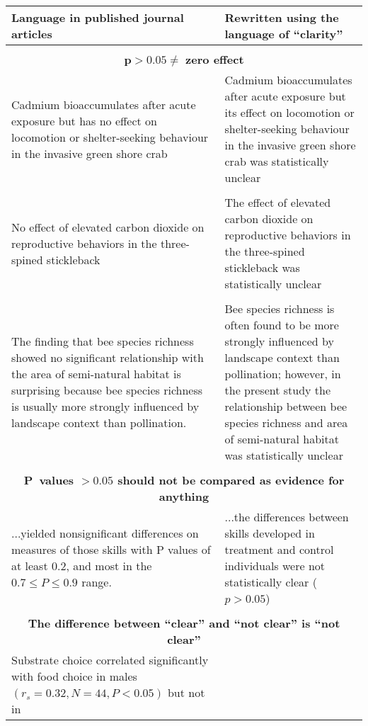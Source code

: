 
\begin{tabular}{p{7.5cm}p{7.5cm}}
     Language in published journal articles & Rewritten using the language of ``clarity'' \\
     	\hline
        \\
     \multicolumn{2}{c}{$\mathbf{p > 0.05 \neq}$ \textbf{zero effect}} \\
        Cadmium bioaccumulates after acute exposure but has no effect on locomotion or shelter-seeking behaviour in the
        invasive green shore crab & Cadmium bioaccumulates after acute exposure but its effect on locomotion or shelter-seeking 
        behaviour in the invasive green shore crab was statistically unclear \\ 
        \\
        No effect of elevated carbon dioxide on reproductive behaviors in the three-spined stickleback & The effect of elevated 
        carbon dioxide on reproductive behaviors in the three-spined stickleback was statistically unclear \\
        \\
        The finding that bee species richness showed no significant relationship with the area of semi-natural habitat is 
        surprising because bee species richness is usually more strongly influenced by landscape context than pollination.
& 
        Bee species richness is often found to be more strongly influenced by landscape context than pollination; however, 
        in the present study the relationship between bee species richness and area of semi-natural habitat was statistically 
        unclear \\ 
        \\
     \multicolumn{2}{c}{\textbf{P~values $\mathbf{> 0.05}$ should not be compared as evidence for anything}} \\
        ...yielded nonsignificant differences on measures of those skills with P values of at least 0.2, and most in the
        $0.7 \leq P \leq 0.9$ range.
& ...the differences between skills developed in treatment and control individuals
        were not statistically clear ($p > 0.05$) \\
        \\
     \multicolumn{2}{c}{\textbf{The difference between ``clear'' and ``not clear'' is ``not clear''}} \\
        Substrate choice correlated significantly with food choice in males $(r_{s} = 0.32, N = 44, P < 0.05)$ but not in

\end{tabular}

